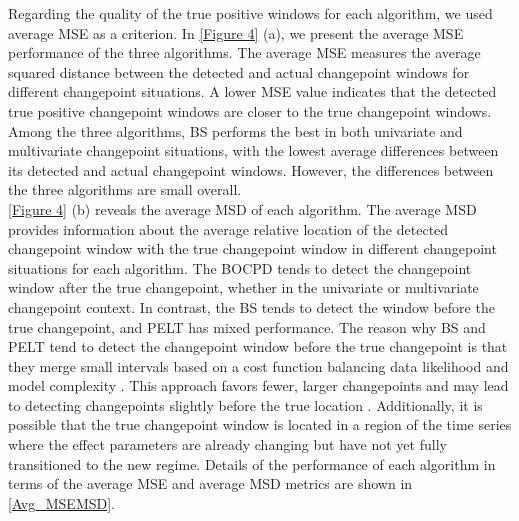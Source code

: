 \documentclass[]{interact}
\theoremstyle{plain}%
\theoremstyle{definition}
\theoremstyle{remark}
\begin{document}
    Regarding the quality of the true positive windows for each algorithm, we used average MSE as a criterion. In \autoref{Figure 4} (a), we present the average MSE performance of the three algorithms. The average MSE measures the average squared distance between the detected and actual changepoint windows for different changepoint situations. A lower MSE value indicates that the detected true positive changepoint windows are closer to the true changepoint windows. Among the three algorithms, BS performs the best in both univariate and multivariate changepoint situations, with the lowest average differences between its detected and actual changepoint windows. However, the differences between the three algorithms are small overall. \\
    
    \autoref{Figure 4} (b) reveals the average MSD of each algorithm. The average MSD provides information about the average relative location of the detected changepoint window with the true changepoint window in different changepoint situations for each algorithm. The BOCPD tends to detect the changepoint window after the true changepoint, whether in the univariate or multivariate changepoint context. In contrast, the BS tends to detect the window before the true changepoint, and PELT has mixed performance. The reason why BS and PELT tend to detect the changepoint window before the true changepoint is that they merge small intervals based on a cost function balancing data likelihood and model complexity \cite{killickOptimalDetectionChangepoints2012}. This approach favors fewer, larger changepoints and may lead to detecting changepoints slightly before the true location \citealp{fearnheadChangepointDetectionPresence2019}. Additionally, it is possible that the true changepoint window is located in a region of the time series where the effect parameters are already changing but have not yet fully transitioned to the new regime. Details of the performance of each algorithm in terms of the average MSE and average MSD metrics are shown in \autoref{Avg_MSEMSD}.
\end{document}
